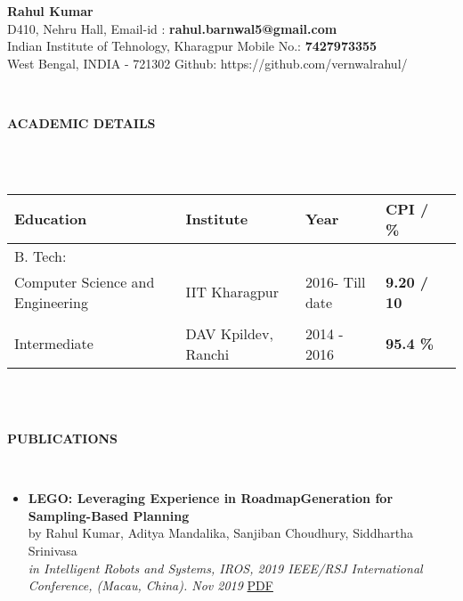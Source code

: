 \documentclass[a4paper,8pt]{article}
\newcommand{\lsep}{-0.5cm}
\newcommand{\resheading}[1]{{\small \colorbox{mygrey}{\begin{minipage}{0.975\textwidth}{\textbf{#1 \vphantom{p\^{E}}}}\end{minipage}}}}
\begin{document}
\begin{center}
\textbf{\Huge Rahul Kumar \\ }  
\indent \hfill \break
\indent D410, Nehru Hall, \hfill Email-id : \textbf{rahul.barnwal5@gmail.com} \\
\indent Indian Institute of Tehnology, Kharagpur \hfill Mobile No.: \textbf{7427973355} \\
\indent West Bengal, INDIA - 721302  \hfill Github: {https://github.com/vernwalrahul/} \\
\end{center}

\hspace{0.5cm}\\[-0.2cm]
\resheading{\textbf{ACADEMIC DETAILS} }\\[\lsep]
\\ 

\indent \begin{tabular}{ l @{\hskip 0.25in} l @{\hskip 0.25in} l @{\hskip 0.25in} l @{\hskip 0.25in} l }
\hline
\textbf{Education} & \textbf{Institute} & \textbf{Year} & \textbf{CPI / \%} \\
\hline
B. Tech:\\
{Computer Science and Engineering} & IIT Kharagpur  & 2016- Till date & \textbf{9.20 / 10} \\ \\
Intermediate & DAV Kpildev, Ranchi & 2014 - 2016 & \textbf{95.4 \%}\\
\hline
\end{tabular}
\\ \hfill \break \\
\resheading{\textbf{ PUBLICATIONS} }\\[\lsep]
\begin{itemize} 
\item \textbf{LEGO: Leveraging Experience in RoadmapGeneration for Sampling-Based Planning} \\
	by Rahul Kumar, Aditya Mandalika, Sanjiban Choudhury, Siddhartha Srinivasa \\ 
	\textit{in Intelligent Robots and Systems, IROS, 2019 IEEE/RSJ International Conference, (Macau, China). Nov 2019} \href{https://arxiv.org/abs/1907.09574} {PDF}

\end{itemize}
\end{document}

